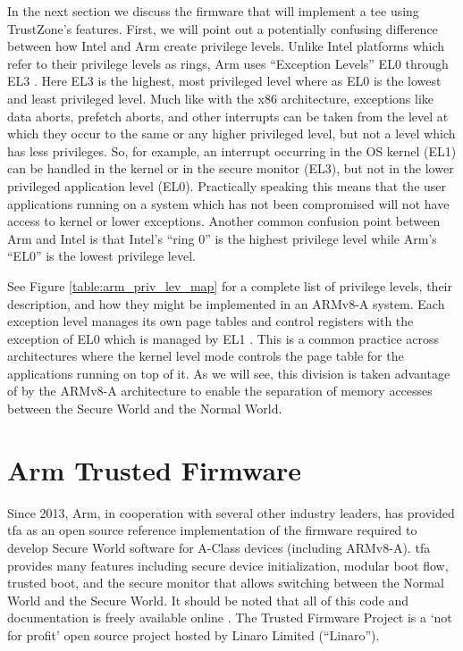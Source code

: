In the next section we discuss the firmware that will implement a \gls{tee} using TrustZone's features. First, we will point out a potentially confusing difference between how Intel and Arm create privilege levels. Unlike Intel platforms which refer to their privilege levels as \glspl{ring}, Arm uses ``Exception Levels'' EL0 through EL3 \cite{armfundv8A}. Here EL3 is the highest, most privileged level where as EL0 is the lowest and least privileged level. Much like with the x86 architecture, exceptions like data aborts, prefetch aborts, and other interrupts can be taken from the level at which they occur to the same or any higher privileged level, but not a level which has less privileges. So, for example, an interrupt occurring in the OS kernel (EL1) can be handled in the kernel or in the secure monitor (EL3), but not in the lower privileged application level (EL0). Practically speaking this means that the user applications running on a system which has not been compromised will not have access to kernel or lower exceptions. Another common confusion point between Arm and Intel is that Intel's ``\gls{ring} 0'' is the highest privilege level while Arm's ``EL0'' is the lowest privilege level.

\renewcommand{\arraystretch}{2.5}


See Figure \ref{table:arm_priv_lev_map} for a complete list of privilege levels, their description, and how they might be implemented in an ARMv8-A system. Each exception level manages its own page tables and control registers with the exception of EL0 which is managed by EL1 \cite{armfundv8A}. This is a common practice across architectures where the kernel level mode controls the page table for the applications running on top of it. As we will see, this division is taken advantage of by the ARMv8-A architecture to enable the separation of memory accesses between the Secure World and the Normal World.

\section{Arm Trusted Firmware}
Since 2013, Arm, in cooperation with several other industry leaders, has provided \gls{tfa} as an open source reference implementation of the firmware required to develop Secure World software for A-Class devices (including ARMv8-A). \gls{tfa} provides many features including secure device initialization, modular boot flow, trusted boot, and the secure monitor that allows switching between the Normal World and the Secure World. It should be noted that all of this code and documentation is freely available online \cite{urlTrustedFirmware}. The Trusted Firmware Project is a `not for profit' open source project hosted by Linaro Limited (``Linaro'').


